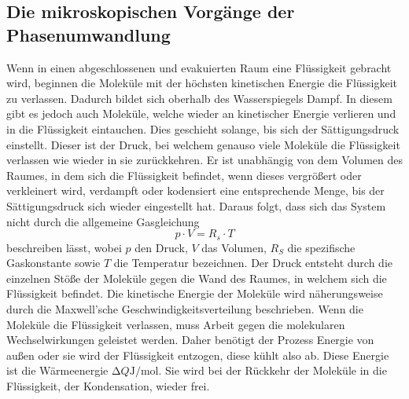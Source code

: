   \subsection{Die mikroskopischen Vorgänge der Phasenumwandlung}
  \label{sec:mikrovorgänge}
  Wenn in einen abgeschlossenen und evakuierten Raum eine Flüssigkeit gebracht wird, beginnen die Moleküle mit der höchsten
  kinetischen Energie die Flüssigkeit zu verlassen. Dadurch bildet sich oberhalb des Wasserspiegels Dampf. In diesem
  gibt es jedoch auch Moleküle, welche wieder an kinetischer Energie verlieren und in die Flüssigkeit eintauchen. Dies geschieht
  solange, bis sich der Sättigungsdruck einstellt. Dieser ist der Druck, bei welchem genauso viele Moleküle die Flüssigkeit
  verlassen wie wieder in sie zurückkehren. Er ist unabhängig von dem Volumen des Raumes, in dem sich die Flüssigkeit befindet,
  wenn dieses vergrößert oder verkleinert wird, verdampft oder kodensiert eine entsprechende Menge, bis der Sättigungsdruck sich
  wieder eingestellt hat. Daraus folgt, dass sich das System nicht durch die allgemeine Gasgleichung
  \begin{equation}
    \label{eqn:gasgleichung}
      p \cdot V = R_{s} \cdot T
  \end{equation}
  beschreiben lässt, wobei $p$ den Druck, $V$ das Volumen, $R_{S}$ die spezifische Gaskonstante sowie $T$ die Temperatur bezeichnen.
  Der Druck entsteht durch die einzelnen Stöße der Moleküle gegen die Wand des Raumes,
  in welchem sich die Flüssigkeit befindet. Die kinetische Energie der Moleküle wird näherungsweise durch die Maxwell'sche
  Geschwindigkeitsverteilung beschrieben. Wenn die Moleküle die Flüssigkeit verlassen, muss Arbeit gegen die molekularen
  Wechselwirkungen geleistet werden. Daher benötigt der Prozess Energie von außen oder sie wird der Flüssigkeit entzogen, diese
  kühlt also ab. Diese Energie ist die Wärmeenergie $\increment Q \si{\joule\per\mol}$. Sie wird bei der Rückkehr der Moleküle in
  die Flüssigkeit, der Kondensation, wieder frei.
